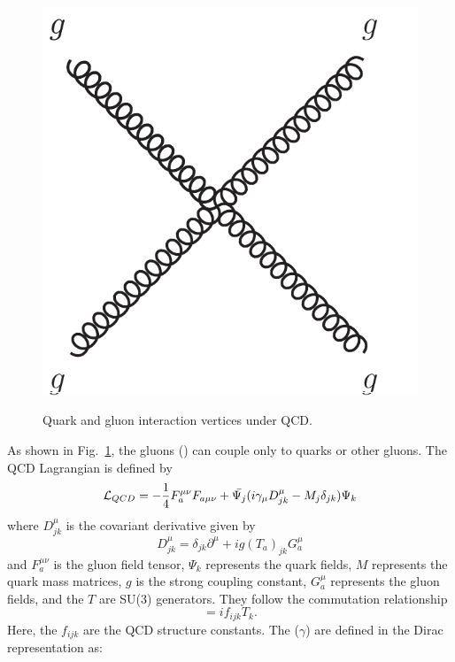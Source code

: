 \begin{figure}[htb!]
{ \includegraphics[scale=0.3,keepaspectratio=true]{images/QCD_vertices_3.pdf}
}
\caption{Quark and gluon interaction vertices under QCD.}
\label{fig:FeynQCDGluonCoupling}
\end{figure}

As shown in Fig.~\ref{fig:FeynQCDGluonCoupling}, the gluons () can couple only to quarks or other gluons. The QCD Lagrangian is defined by
\begin{equation}
 {\cal L}_{QCD} = -\frac{1}{4} F_{a}^{\mu\nu} F_{a\mu\nu}+\bar{\Psi_{j}}(i\gamma_{\mu}D^{\mu}_{jk}-M_{j}\delta_{jk})\Psi_{k}
\end{equation}
where $D^{\mu}_{jk}$ is the covariant derivative given by
\begin{equation}
 D^{\mu}_{jk} = \delta_{jk}\partial^{\mu}+ig(T_{a})_{jk}G_{a}^{\mu}
\end{equation}
and $F_{a}^{\mu\nu}$ is the gluon field tensor, $\Psi_{k}$ represents the quark fields, $M$ represents the quark mass matrices, $g$ is the strong coupling constant, $G_{a}^{\mu}$ represents the gluon fields, and the $T$ are SU(3) generators. They follow the commutation relationship
\begin{equation}
 [T_{i},T_{j}]=if_{ijk}T_{k}.
\end{equation}
Here, the $f_{ijk}$ are the QCD structure constants. The  ($\gamma$) are defined in the Dirac representation as:

